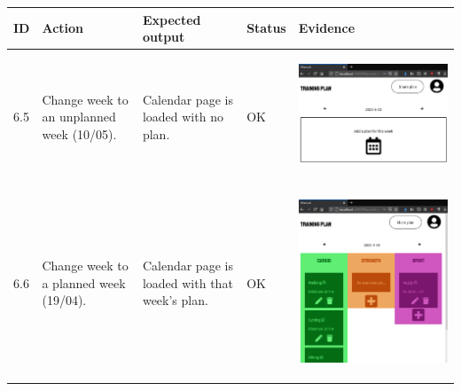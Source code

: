 \documentclass[12pt,twoside,titlepage,a4paper]{article}
\theoremstyle{definicion}
\theoremstyle{lema}
\theoremstyle{teorema}
\theoremstyle{corolario}
\theoremstyle{ejemplo}
\theoremstyle{nota}
\begin{document}
\begin{table}[!h]
	\centering
	\begin{tabular}{|m{0.6cm}|m{2.9cm}|m{3.6cm}|m{1.1cm}|m{5.9cm}|}
		\hline
		\textbf{ID} & \textbf{Action} & \textbf{Expected output} & \textbf{Status} & \textbf{Evidence} \\ 
		\hline
		6.5 & Change week to an unplanned week (10/05). & Calendar page is loaded with no plan. & OK &
		\begin{center}\includegraphics[scale=0.22]{calendar2.png}\end{center} \\
		\hline
		6.6 & Change week to a planned week (19/04). & Calendar page is loaded with that week's plan. & OK &
		\begin{center}\includegraphics[scale=0.22]{calendar3.png}\end{center} \\

\end{tabular}
\end{table}
\end{document}
